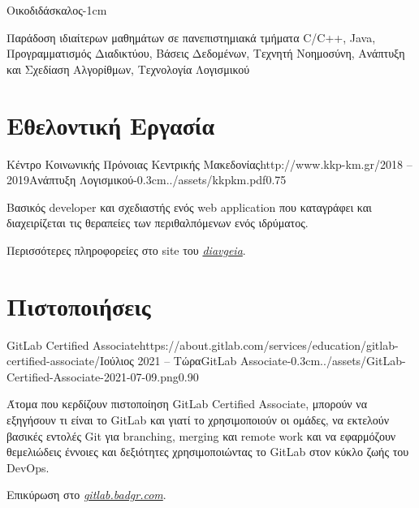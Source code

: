 \documentclass{mycv}
\begin{document}
	\vspace*{-1.2cm}

	\begin{EntryDated}{}{}{}{Οικοδιδάσκαλος}{-1cm}
		\begin{Itemize}
			\item Παράδοση ιδιαίτερων μαθημάτων σε πανεπιστημιακά τμήματα C/C++, Java, Προγραμματισμός Διαδικτύου, Βάσεις Δεδομένων, Τεχνητή Νοημοσύνη, Ανάπτυξη και Σχεδίαση Αλγορίθμων, Τεχνολογία Λογισμικού
		\end{Itemize}
	\end{EntryDated}
	
	\section{Εθελοντική Εργασία}
	\begin{EntryDatedLogo}{Κέντρο Κοινωνικής Πρόνοιας Κεντρικής Μακεδονίας}{http://www.kkp-km.gr/}{2018 -- 2019}{Ανάπτυξη Λογισμικού}{-0.3cm}{../assets/kkpkm.pdf}{0.75}
		\begin{Itemize}
			\item Βασικός developer και σχεδιαστής ενός web application που καταγράφει και διαχειρίζεται τις θεραπείες των περιθαλπόμενων ενός ιδρύματος.
			\item Περισσότερες πληροφορείες στο site του  \href{https://diavgeia.gov.gr/decision/view/\%CE\%A8\%CE\%A6\%CE\%A1\%CE\%93\%CE\%9F\%CE\%9E\%CE\%A7\%CE\%A3-\%CE\%A0\%CE\%93\%CE\%A6}{\textit{diavgeia}}.
		\end{Itemize}
	\end{EntryDatedLogo}

	\section{Πιστοποιήσεις}
    \begin{EntryDatedLogo}{GitLab Certified Associate}{https://about.gitlab.com/services/education/gitlab-certified-associate/}{Ιούλιος 2021 -- Τώρα}{GitLab Associate}{-0.3cm}{../assets/GitLab-Certified-Associate-2021-07-09.png}{0.90}
		\begin{Itemize}
			\item Άτομα που κερδίζουν πιστοποίηση GitLab Certified Associate, μπορούν να εξηγήσουν τι είναι το GitLab και γιατί το χρησιμοποιούν οι ομάδες, να εκτελούν βασικές εντολές Git για branching, merging και remote work και να εφαρμόζουν θεμελιώδεις έννοιες και δεξιότητες χρησιμοποιώντας το GitLab στον κύκλο ζωής του DevOps. 
			\item Επικύρωση στο \href{https://gitlab.badgr.com/public/assertions/Hw6j8Th9SyKNj8ehsQkqAw}{\textit{gitlab.badgr.com}}.
		\end{Itemize}
	\end{EntryDatedLogo}
	
\end{document}
